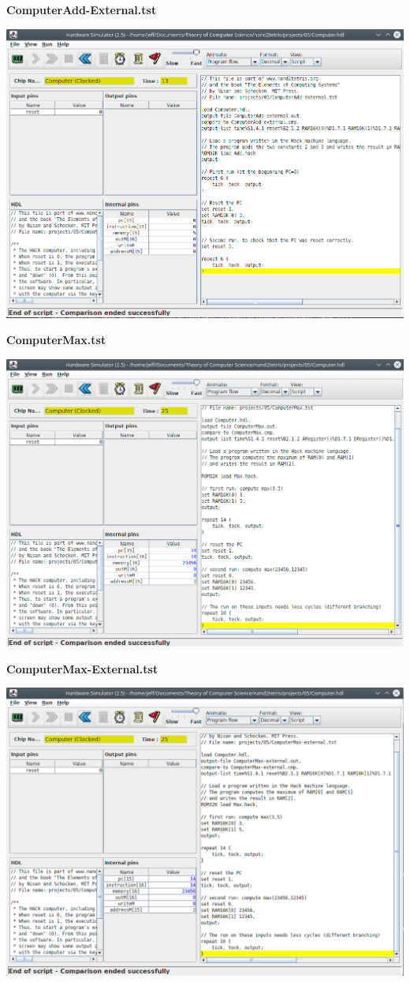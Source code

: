 \documentclass[titlepage]{article}
\begin{document}
\begin{description}
{    \textbf{ComputerAdd-External.tst}

    \includegraphics[width=.9\textwidth]{computer-add-external.png}

    \textbf{ComputerMax.tst}

    \includegraphics[width=.9\textwidth]{computer-max.png}

    \textbf{ComputerMax-External.tst}

    \includegraphics[width=.9\textwidth]{computer-max-external.png}

}
\end{description}
\end{document}
